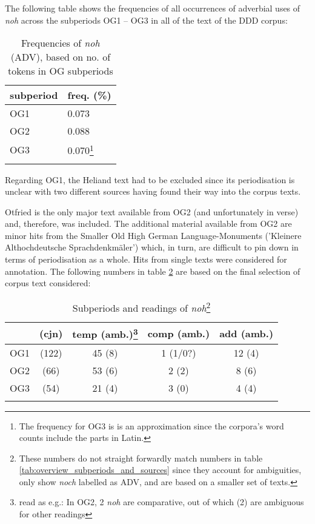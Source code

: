 \documentclass[output=paper,
modfonts
]{langscibook}
\begin{document}
\noindent The following table shows the frequencies of all occurrences of adverbial uses of \textit{noh} across the subperiods OG1 -- OG3 in all of the text of the DDD corpus:

\begin{table}[H]\small
\begin{tabular}{l|l}
\lsptoprule
subperiod	& freq. (\%)	\\
\midrule
OG1		& 0.073 \\
\midrule
OG2		& 0.088 \\
\midrule
OG3		& 0.070\footnote{The frequency for OG3 is is an approximation since the corpora's word counts include the parts in Latin.}\\
\lspbottomrule
\end{tabular}
\caption{Frequencies of \textit{noh} (ADV), based on no. of tokens in OG subperiods}
\label{tab:frequencies_of_noh}
\end{table}

\noindent Regarding OG1, the Heliand text had to be excluded since its periodisation is unclear with two different sources having found their way into the corpus texts.

Otfried is the only major text available from OG2 (and unfortunately in verse) and, therefore, was included. The additional material available from OG2 are minor hits from the Smaller Old High German Language-Monuments ('Kleinere Althochdeutsche Sprachdenkmäler') which, in turn, are difficult to pin down in terms of periodisation as a whole. Hits from single texts were considered for annotation. The following numbers in table \ref{tab:subperiods_and_readings} are based on the final selection of corpus text considered:


\begin{table}[H]\small
\begin{tabular}{l|c|c|c|c}
\lsptoprule
	& (cjn) & temp (amb.)\footnote{ read as e.g.: In OG2, 2 \textit{noh} are comparative, out of which (2) are ambiguous for other readings}& comp (amb.)	& add (amb.)	\\
\midrule
OG1		& (122) & 45 (8)    & 1 (1/0?)  & 12 (4)    \\
\midrule
OG2		& (66)  & 53 (6)    & 2 (2)     & 8 (6)     \\
\midrule
OG3		& (54)  & 21 (4)    & 3 (0)     & 4 (4)     \\
\lspbottomrule
\end{tabular}
\caption{Subperiods and readings of \textit{noh}\footnote{ These numbers do not straight forwardly match numbers in table \ref{tab:overview_subperiods_and_sources} since they account for ambiguities, only show \textit{noch} labelled as ADV, and are based on a smaller set of texts.}}
\label{tab:subperiods_and_readings}
\end{table}
\end{document}
